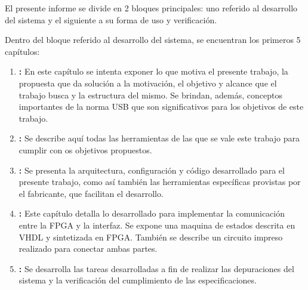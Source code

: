 El presente informe se divide en 2 bloques principales: uno referido al desarrollo del sistema y el siguiente a su forma de uso y verificación.

Dentro del bloque referido al desarrollo del sistema, se encuentran los primeros 5 capítulos:

\begin{enumerate}
	\item {\bf {}:} En este capítulo se intenta exponer lo que motiva el presente trabajo, la propuesta que da solución a la motivación, el objetivo y alcance que el trabajo busca y la estructura del mismo. Se brindan, además, conceptos importantes de la norma USB que son significativos para los objetivos de este trabajo.
	\item {\bf {}:} Se describe aquí todas las herramientas de las que se vale este trabajo para cumplir con os objetivos propuestos.
	\item {\bf {}:} Se presenta la arquitectura, configuración y código desarrollado para el presente trabajo, como así también las herramientas específicas provistas por el fabricante, que facilitan el desarrollo. 
	\item {\bf {}:} Este capítulo detalla lo desarrollado para implementar la comunicación entre la FPGA y la interfaz. Se expone una maquina de estados descrita en VHDL y sintetizada en FPGA. También se describe un circuito impreso realizado para conectar ambas partes.
	\item {\bf {}:} Se desarrolla las tareas desarrolladas a fin de realizar las depuraciones del sistema y la verificación del cumplimiento de las especificaciones.
\end{enumerate}
